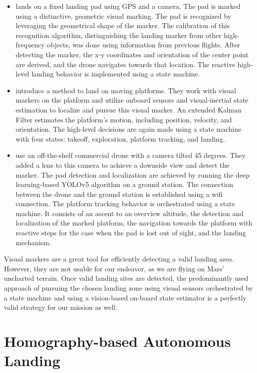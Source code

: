\begin{itemize}
    \item \citet{Saripalli2002VisionBasedLanding} lands on a fixed landing pad using GPS and a camera. The pad is marked using a distinctive, geometric visual marking. The pad is recognized by leveraging the geometrical shape of the marker. The calibration of this recognition algorithm, distinguishing the landing marker from other high-frequency objects, was done using information from previous flights. After detecting the marker, the x-y coordinates and orientation of the center point are derived, and the drone navigates towards that location. The reactive high-level landing behavior is implemented using a state machine.
    \item \citet{Falanga2017QuadrotorLanding} introduce a method to land on moving platforms. They work with visual markers on the platform and utilize onboard sensors and visual-inertial state estimation to localize and pursue this visual marker. An extended Kalman Filter estimates the platform's motion, including position, velocity, and orientation. The high-level decisions are again made using a state machine with four states: takeoff, exploration, platform tracking, and landing. 
    \item \citet{Mu2023VisionBasedLanding} use an off-the-shelf commercial drone with a camera tilted 45 degrees. They added a lens to this camera to achieve a downside view and detect the marker. The pad detection and localization are achieved by running the deep learning-based YOLOv5 algorithm on a ground station. The connection between the drone and the ground station is established using a wifi connection. The platform tracking behavior is orchestrated using a state machine. It consists of an ascent to an overview altitude, the detection and localization of the marked platform, the navigation towards the platform with reactive steps for the case when the pad is lost out of sight, and the landing mechanism.
\end{itemize}

Visual markers are a great tool for efficiently detecting a valid landing area. However, they are not usable for our endeavor, as we are flying on Mars' uncharted terrain. Once valid landing sites are detected, the predominantly used approach of pursuing the chosen landing zone using visual sensors orchestrated by a state machine and using a vision-based on-board state estimator is a perfectly valid strategy for our mission as well.


\section{Homography-based Autonomous Landing}

